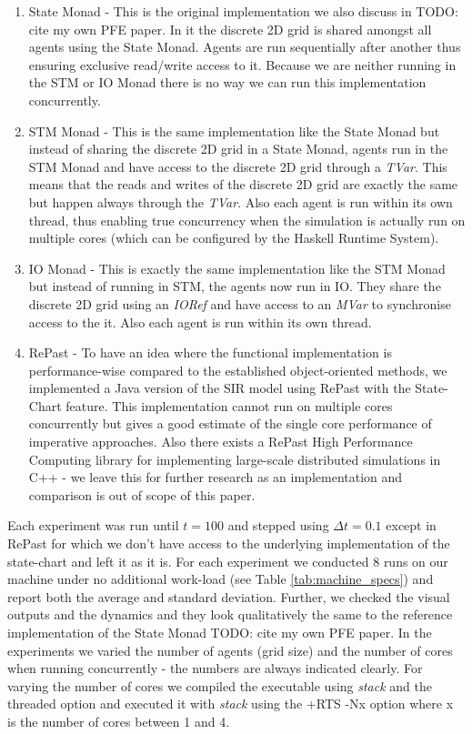 \begin{enumerate}
	\item State Monad - This is the original implementation we also discuss in TODO: cite my own PFE paper. In it the discrete 2D grid is shared amongst all agents using the State Monad. Agents are run sequentially after another thus ensuring exclusive read/write access to it. Because we are neither running in the STM or IO Monad there is no way we can run this implementation concurrently.
	\item STM Monad - This is the same implementation like the State Monad but instead of sharing the discrete 2D grid in a State Monad, agents run in the STM Monad and have access to the discrete 2D grid through a \textit{TVar}. This means that the reads and writes of the discrete 2D grid are exactly the same but happen always through the \textit{TVar}. Also each agent is run within its own thread, thus enabling true concurrency when the simulation is actually run on multiple cores (which can be configured by the Haskell Runtime System).
	\item IO Monad - This is exactly the same implementation like the STM Monad but instead of running in STM, the agents now run in IO. They share the discrete 2D grid using an \textit{IORef} and have access to an \textit{MVar} to synchronise access to the it. Also each agent is run within its own thread.
	\item RePast - To have an idea where the functional implementation is performance-wise compared to the established object-oriented methods, we implemented a Java version of the SIR model using RePast with the State-Chart feature. This implementation cannot run on multiple cores concurrently but gives a good estimate of the single core performance of imperative approaches. Also there exists a RePast High Performance Computing library for implementing large-scale distributed simulations in C++ - we leave this for further research as an implementation and comparison is out of scope of this paper.
\end{enumerate}

Each experiment was run until $t = 100$ and stepped using $\Delta t = 0.1$ except in RePast for which we don't have access to the underlying implementation of the state-chart and left it as it is. For each experiment we conducted 8 runs on our machine under no additional work-load (see Table \ref{tab:machine_specs}) and report both the average and standard deviation. Further, we checked the visual outputs and the dynamics and they look qualitatively the same to the reference implementation of the State Monad TODO: cite my own PFE paper. In the experiments we varied the number of agents (grid size) and the number of cores when running concurrently - the numbers are always indicated clearly. For varying the number of cores we compiled the executable using \textit{stack} and the threaded option and executed it with \textit{stack} using the +RTS -Nx option where x is the number of cores between 1 and 4. 

